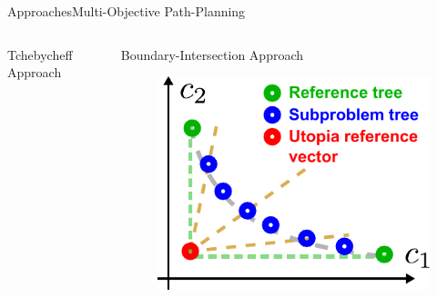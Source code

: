 \begin{frame}{Approaches}{Multi-Objective Path-Planning}
\begin{columns}
\begin{block}{Tchebycheff Approach}
\begin{figure}[t]
		\end{figure}
	    \end{block}
		\begin{block}{Boundary-Intersection Approach}
		\begin{figure}[t]
			\centering
			\includegraphics[width=\linewidth]{figure/MORRF_boundary_intersection}
		\end{figure}
    	\end{block}
	\end{columns}
	
\end{frame}

